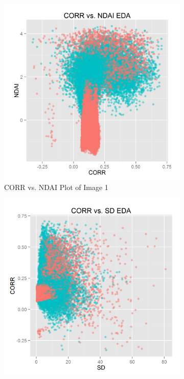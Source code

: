 \documentclass{article}\usepackage[]{graphicx}\usepackage[]{color}
\begin{document}
\begin{figure}[]
  \centering 
  \begin{subfigure}[b]{0.3\textwidth}
    \includegraphics[width=\linewidth]{CORR_vs_NDAI.png}
    \caption{CORR vs. NDAI Plot of Image 1}
    \label{CorrNdai}
  \end{subfigure} 
  \begin{subfigure}[b]{0.3\textwidth}
    \includegraphics[width=\linewidth]{CORR_vs_SD.png}

\end{subfigure}
\end{figure}
\end{document}
